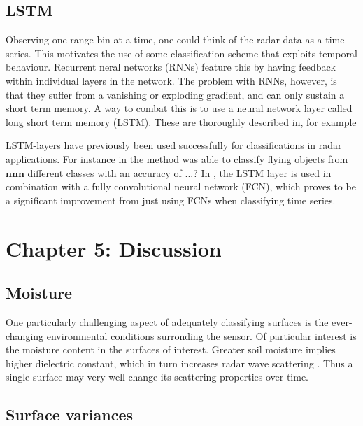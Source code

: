 \documentclass[a4paper, 12pt]{article}
\begin{document}
\subsection{LSTM}
Observing one range bin at a time, one could think of the radar data as a time series. This motivates the use of some classification scheme that exploits temporal behaviour. Recurrent neral networks (RNNs) feature this by having feedback within individual layers in the network. \citep{karim_majumdar_darabi_chen_2018} The problem with RNNs, however, is that they suffer from a vanishing or exploding gradient, and can only sustain a short term memory. A way to combat this is to use a neural network layer called long short term memory (LSTM). These are thoroughly described in, for example \citep{hochreiter_schmidhuber_1997}

LSTM-layers have previously been used successfully for classifications in radar applications. For instance in \citep{jithesh_sagayaraj_srinivasa_2018} the method was able to classify flying objects from $\textbf{nnn}$ different classes with an accuracy of ...? In \citep{karim_majumdar_darabi_chen_2018}, the LSTM layer is used in combination with a fully convolutional neural network (FCN), which proves to be a significant improvement from just using FCNs when classifying time series.

\section{Chapter 5: Discussion}


\subsection{Moisture}

One particularly challenging aspect of adequately classifying surfaces is the ever-changing environmental conditions surronding the sensor. Of particular interest is the moisture content in the surfaces of interest. Greater soil moisture implies higher dielectric constant, which in turn increases radar wave scattering \citep{rappaport_2006}. Thus a single surface may very well change its scattering properties over time. 


\subsection{Surface variances}
\end{document}
